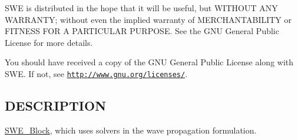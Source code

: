 S\-W\-E is distributed in the hope that it will be useful, but W\-I\-T\-H\-O\-U\-T A\-N\-Y W\-A\-R\-R\-A\-N\-T\-Y; without even the implied warranty of M\-E\-R\-C\-H\-A\-N\-T\-A\-B\-I\-L\-I\-T\-Y or F\-I\-T\-N\-E\-S\-S F\-O\-R A P\-A\-R\-T\-I\-C\-U\-L\-A\-R P\-U\-R\-P\-O\-S\-E. See the G\-N\-U General Public License for more details.

You should have received a copy of the G\-N\-U General Public License along with S\-W\-E. If not, see \href{http://www.gnu.org/licenses/}{\tt http\-://www.\-gnu.\-org/licenses/}.\hypertarget{NetCdfWriter_8hh_DESCRIPTION}{}\subsection{D\-E\-S\-C\-R\-I\-P\-T\-I\-O\-N}\label{NetCdfWriter_8hh_DESCRIPTION}
\hyperlink{classSWE__Block}{S\-W\-E\-\_\-\-Block}, which uses solvers in the wave propagation formulation. 